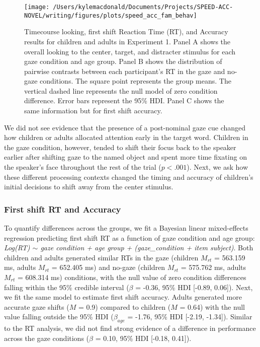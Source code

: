 \documentclass[10pt, letterpaper]{article}
\newenvironment{CodeChunk}{}{}
\begin{document}
\begin{CodeChunk}
\begin{figure*}[t]

{\centering \texttt{[image: /Users/kylemacdonald/Documents/Projects/SPEED-ACC-NOVEL/writing/figures/plots/speed\_acc\_fam\_behav]} 

}

\caption[Timecourse looking, first shift Reaction Time (RT), and Accuracy results for children and adults in Experiment 1]{Timecourse looking, first shift Reaction Time (RT), and Accuracy results for children and adults in Experiment 1. Panel A shows the overall looking to the center, target, and distracter stimulus for each gaze condition and age group. Panel B shows the distribution of pairwise contrasts between each participant's RT in the gaze and no-gaze conditions. The square point represents the group means. The vertical dashed line represents the null model of zero condition difference. Error bars represent the 95\% HDI. Panel C shows the same information but for first shift accuracy.}\label{fig:speed-acc-gaze-results}
\end{figure*}
\end{CodeChunk}

We did not see evidence that the presence of a post-nominal gaze cue
changed how children or adults allocated attention early in the target
word. Children in the gaze condition, however, tended to shift their
focus back to the speaker earlier after shifting gaze to the named
object and spent more time fixating on the speaker's face throughout the
rest of the trial (\(p < .001\)). Next, we ask how these different
processing contexts changed the timing and accuracy of children's
initial decisions to shift away from the center stimulus.

\hypertarget{first-shift-rt-and-accuracy}{%
\subsubsection{First shift RT and
Accuracy}\label{first-shift-rt-and-accuracy}}

To quantify differences across the groups, we fit a Bayesian linear
mixed-effects regression predicting first shift RT as a function of gaze
condition and age group: \emph{Log(RT) \(\sim\) gaze condition + age
group + (gaze\_condition + item \textbar{} subject)}. Both children and
adults generated similar RTs in the gaze (children \(M_{rt}\) = 563.159
ms, adults \(M_{rt}\) = 652.405 ms) and no-gaze (children \(M_{rt}\) =
575.762 ms, adults \(M_{rt}\) = 608.314 ms) conditions, with the null
value of zero condition differences falling within the 95\% credible
interval (\(\beta\) = -0.36, 95\% HDI {[}-0.89, 0.06{]}). Next, we fit
the same model to estimate first shift accuracy. Adults generated more
accurate gaze shifts (\(M\) = 0.9) compared to children (\(M\) = 0.64)
with the null value falling outside the 95\% HDI (\(\beta_{age}\) =
-1.76, 95\% HDI {[}-2.19, -1.34{]}). Similar to the RT analysis, we did
not find strong evidence of a difference in performance across the gaze
conditions (\(\beta\) = 0.10, 95\% HDI {[}-0.18, 0.41{]}).
\end{document}
